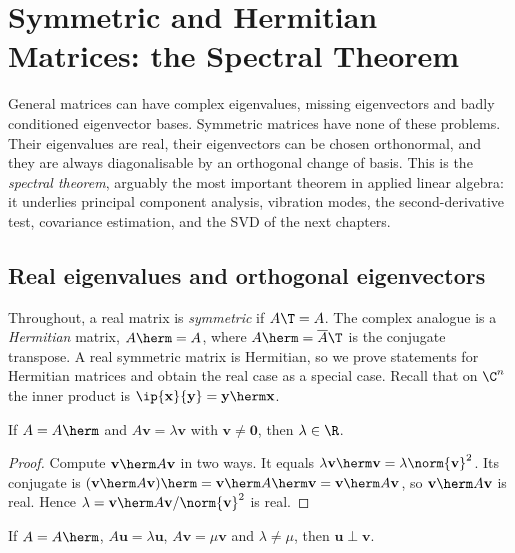 \chapter{Symmetric and Hermitian Matrices: the Spectral Theorem}

General matrices can have complex eigenvalues, missing eigenvectors and badly conditioned eigenvector bases. Symmetric matrices have none of these problems. Their eigenvalues are real, their eigenvectors can be chosen orthonormal, and they are always diagonalisable by an orthogonal change of basis. This is the \emph{spectral theorem}, arguably the most important theorem in applied linear algebra: it underlies principal component analysis, vibration modes, the second-derivative test, covariance estimation, and the SVD of the next chapters.

\section{Real eigenvalues and orthogonal eigenvectors}

Throughout, a real matrix is \emph{symmetric} if $A\T=A$. The complex analogue is a \emph{Hermitian} matrix, $A\herm=A$, where $A\herm=\overline{A}\T$ is the conjugate transpose. A real symmetric matrix is Hermitian, so we prove statements for Hermitian matrices and obtain the real case as a special case. Recall that on $\C^n$ the inner product is $\ip{\mathbf{x}}{\mathbf{y}}=\mathbf{y}\herm\mathbf{x}$.

\begin{theorem}\label{thm:realeig}
If $A=A\herm$ and $A\mathbf{v}=\lambda\mathbf{v}$ with $\mathbf{v}\ne\mathbf{0}$, then $\lambda\in\R$.
\end{theorem}

\begin{proof}
Compute $\mathbf{v}\herm A\mathbf{v}$ in two ways. It equals $\lambda\mathbf{v}\herm\mathbf{v}=\lambda\norm{\mathbf{v}}^2$. Its conjugate is $(\mathbf{v}\herm A\mathbf{v})\herm=\mathbf{v}\herm A\herm\mathbf{v}=\mathbf{v}\herm A\mathbf{v}$, so $\mathbf{v}\herm A\mathbf{v}$ is real. Hence $\lambda=\mathbf{v}\herm A\mathbf{v}/\norm{\mathbf{v}}^2$ is real.
\end{proof}

\begin{theorem}\label{thm:orthoeig}
If $A=A\herm$, $A\mathbf{u}=\lambda\mathbf{u}$, $A\mathbf{v}=\mu\mathbf{v}$ and $\lambda\ne\mu$, then $\mathbf{u}\perp\mathbf{v}$.
\end{theorem}

